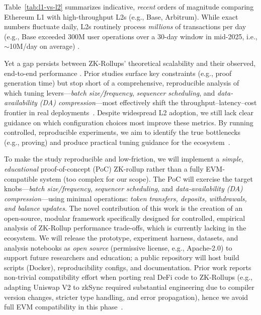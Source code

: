 Table~\ref{tab:l1-vs-l2} summarizes indicative, \emph{recent} orders of magnitude comparing Ethereum L1 with high-throughput L2s (e.g., Base, Arbitrum). While exact numbers fluctuate daily, L2s routinely process \emph{millions} of transactions per day (e.g., Base exceeded 300M user operations over a 30-day window in mid-2025, i.e., $\sim$10M/day on average) \cite{l2beat_activity}.

\vspace{12pt}



\vspace{12pt}

Yet a gap persists between ZK-Rollups’ theoretical scalability and their observed, end-to-end performance \cite{habib2025bottlenecks}. Prior studies surface key constraints (e.g., proof generation time) but stop short of a comprehensive, reproducible analysis of which tuning levers—\emph{batch size/frequency}, \emph{sequencer scheduling}, and \emph{data-availability (DA) compression}—most effectively shift the throughput–latency–cost frontier in real deployments~\cite{habib2025bottlenecks,gogol2025scalingdefi}. Despite widespread L2 adoption, we still lack clear guidance on which configuration choices most improve these metrics. By running controlled, reproducible experiments, we aim to identify the true bottlenecks (e.g., proving) and produce practical tuning guidance for the ecosystem~\cite{habib2025bottlenecks}.

\vspace{12pt}

To make the study reproducible and low-friction, we will implement a \emph{simple, educational} proof-of-concept (PoC) ZK-rollup rather than a fully EVM-compatible system (too complex for our scope). The PoC will exercise the target knobs—\emph{batch size/frequency}, \emph{sequencer scheduling}, and \emph{data-availability (DA) compression}—using minimal operations: \emph{token transfers, deposits, withdrawals, and balance updates}. The novel contribution of this work is the creation of an
open-source, modular framework specifically designed for controlled, empirical analysis of ZK-Rollup performance trade-offs, which is currently lacking in the ecosystem. We will release the prototype, experiment harness, datasets, and analysis notebooks as \emph{open source} (permissive license, e.g., Apache-2.0) to support future researchers and education; a public repository will host build scripts (Docker), reproducibility configs, and documentation. Prior work reports
non-trivial compatibility effort when porting real DeFi code to ZK-Rollups (e.g., adapting
Uniswap V2 to zkSync required substantial engineering due to compiler version changes, stricter type handling, and error propagation), hence we avoid full EVM compatibility in this phase~\cite{gogol2025scalingdefi}.

